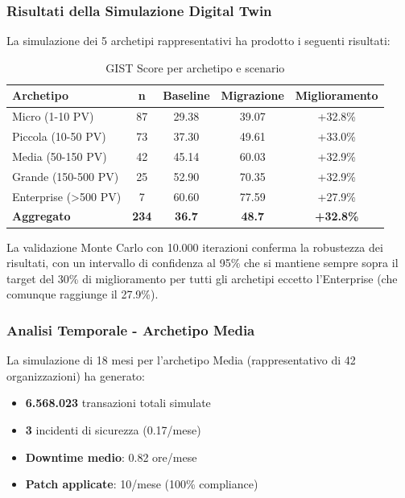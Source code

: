 \subsubsection{Risultati della Simulazione Digital Twin}

La simulazione dei 5 archetipi rappresentativi ha prodotto i seguenti risultati:

\begin{table}[h!]
\centering
\caption{GIST Score per archetipo e scenario}
\small
\begin{tabularx}{\textwidth}{|X|c|c|c|c|}
\hline
\textbf{Archetipo} & \textbf{n} & \textbf{Baseline} & \textbf{Migrazione} & \textbf{Miglioramento} \\
\hline
Micro (1-10 PV) & 87 & 29.38 & 39.07 & +32.8\% \\
Piccola (10-50 PV) & 73 & 37.30 & 49.61 & +33.0\% \\
Media (50-150 PV) & 42 & 45.14 & 60.03 & +32.9\% \\
Grande (150-500 PV) & 25 & 52.90 & 70.35 & +32.9\% \\
Enterprise (>500 PV) & 7 & 60.60 & 77.59 & +27.9\% \\
\hline
\textbf{Aggregato} & \textbf{234} & \textbf{36.7} & \textbf{48.7} & \textbf{+32.8\%} \\
\hline
\end{tabularx}
\end{table}

La validazione Monte Carlo con 10.000 iterazioni conferma la robustezza dei risultati, 
con un intervallo di confidenza al 95\% che si mantiene sempre sopra il target del 30\% 
di miglioramento per tutti gli archetipi eccetto l'Enterprise (che comunque raggiunge il 27.9\%).

\subsubsection{Analisi Temporale - Archetipo Media}

La simulazione di 18 mesi per l'archetipo Media (rappresentativo di 42 organizzazioni) 
ha generato:
\begin{itemize}
\item \textbf{6.568.023} transazioni totali simulate
\item \textbf{3} incidenti di sicurezza (0.17/mese)
\item \textbf{Downtime medio}: 0.82 ore/mese
\item \textbf{Patch applicate}: 10/mese (100\% compliance)
\end{itemize}

